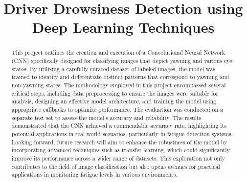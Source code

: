 \documentclass[conference]{IEEEtran}
\begin{document}
\title{Driver Drowsiness Detection using Deep Learning Techniques}
\author{



\and
{}
}\maketitle

\begin{abstract} This project outlines the creation and execution of a Convolutional Neural Network (CNN) specifically designed for classifying images that depict yawning and various eye states. By utilizing a carefully curated dataset of labeled images, the model was trained to identify and differentiate distinct patterns that correspond to yawning and non-yawning states. The methodology employed in this project encompassed several critical steps, including data preprocessing to ensure the images were suitable for analysis, designing an effective model architecture, and training the model using appropriate callbacks to optimize performance. The evaluation was conducted on a separate test set to assess the model's accuracy and reliability. The results demonstrated that the CNN achieved a commendable accuracy rate, highlighting its potential applications in real-world scenarios, particularly in fatigue detection systems. Looking forward, future research will aim to enhance the robustness of the model by incorporating advanced techniques such as transfer learning, which could significantly improve its performance across a wider range of datasets. This exploration not only contributes to the field of image classification but also opens avenues for practical applications in monitoring fatigue levels in various environments.

 \end{abstract}
\end{document}
